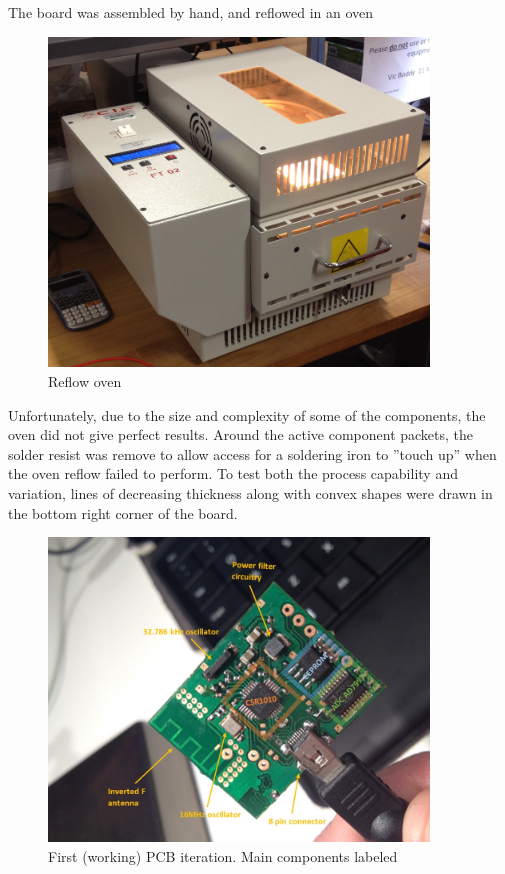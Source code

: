 \documentclass[]{article}
\begin{document}
The board was assembled by hand, and reflowed in an oven

\begin{figure}[htb]
	\begin{center}
		\includegraphics[width = 0.9\textwidth]{oven}
	\end{center}
	\caption{Reflow oven}
	\label{fig:oven}
\end{figure} 

Unfortunately, due to the size and complexity of some of the components, the oven did not give perfect results. Around the active component packets, the solder resist was remove to allow access for a soldering iron to ''touch up'' when the oven reflow failed to perform. To test both the process capability and variation, lines of decreasing thickness along with convex shapes were drawn in the bottom right corner of the board. 


\begin{figure}[h]
	\begin{center}
		\includegraphics[width = 0.9\textwidth]{pcb1.jpg}
	\end{center}
	\caption{First (working) PCB iteration. Main components labeled}
	\label{fig:pcb1.jpg}
\end{figure}
\end{document}
